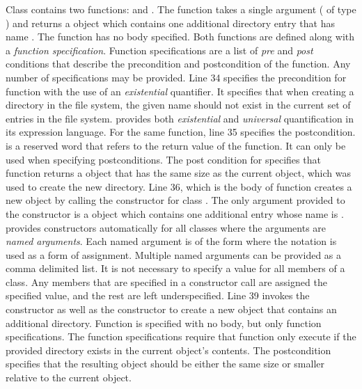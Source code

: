 Class  contains two functions:  and
. The  function takes a single argument
( of type ) and returns a 
object which contains one additional directory entry that has name
. The  function has no body specified. Both
functions are defined along with a {\em function
  specification}. Function specifications are a list of {\em pre} and
{\em post} conditions that describe the precondition and postcondition
of the function. Any number of specifications may be provided. Line 34
specifies the precondition for function  with the use of
an {\em existential} quantifier. It specifies that when creating a
directory in the file system, the given name  should not exist
in the current set of entries in the file system. \Klang{} provides
both {\em existential} and {\em universal} quantification in its
expression language. For the same function, line 35 specifies the
postcondition.  is a reserved word that refers to the
return value of the function. It can only be used when specifying
postconditions. The post condition for  specifies that
function  returns a  object that has the
same size as the current  object, which was used to
create the new directory. Line 36, which is the body of function
 creates a new  object by calling the
constructor for class . The only argument provided to
the constructor is a  object which contains one additional
 entry whose name is . \Klang{} provides
constructors automatically for all classes where the arguments are
{\em named arguments}. Each named argument is of the form  where the \code{::} notation is used as a form of
assignment. Multiple named arguments can be provided as a comma
delimited list. It is not necessary to specify a value for all members
of a class. Any members that are specified in a constructor call are
assigned the specified value, and the rest are left underspecified. 
Line 39 invokes the  constructor as well
as the  constructor to create a new  object
that contains an additional directory. Function  is
specified with no body, but only function specifications. The function
specifications require that function  only execute if the
provided directory  exists in the current object's
contents. The postcondition specifies that the resulting
 object should be either the same size or smaller
relative to the current object.


